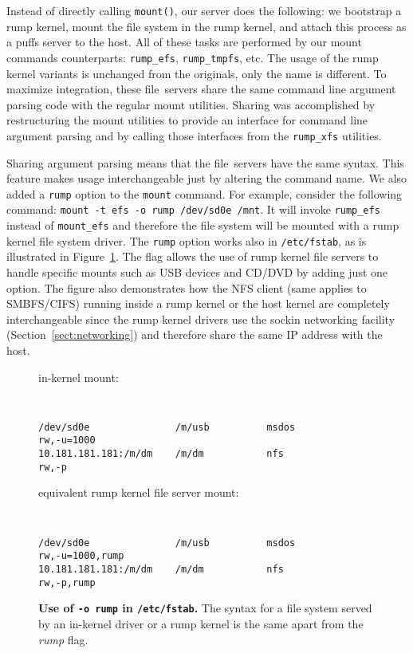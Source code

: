 Instead of directly calling \texttt{mount()}, our server does the
following: we bootstrap a rump
kernel, mount the file system in the rump kernel, and attach this
process as a puffs server to the host.  All of these tasks are
performed by our mount commands counterparts: \verb+rump_efs+,
\verb+rump_tmpfs+, etc.  The usage of the rump kernel variants is
unchanged from the originals, only the name is different.
To maximize integration, these file~servers share the same command
line argument parsing code with the regular mount utilities.  Sharing
was accomplished by restructuring the mount utilities to provide an interface
for command line argument parsing and by calling those interfaces from
the \verb+rump_xfs+ utilities.

Sharing argument parsing means that the file~servers have the
same syntax.  This feature makes usage interchangeable just by altering the
command name.  We also added a \texttt{rump} option to the
\texttt{mount} command.  For example,
consider the following command: \verb+mount -t efs -o rump /dev/sd0e /mnt+.
It will invoke \verb+rump_efs+ instead of \verb+mount_efs+
and therefore the file system will be mounted with a rump kernel
file system driver.
The \texttt{rump} option works also in
\texttt{/etc/fstab}, as is illustrated in Figure~\ref{fig:orump}.
The flag allows the use of rump kernel file servers to handle specific
mounts such as USB devices and CD/DVD by adding just one option.
The figure also demonstrates how the NFS client (same applies to SMBFS/CIFS)
running inside a rump kernel or the host kernel are completely
interchangeable since the rump kernel drivers use the sockin
networking facility (Section~\ref{sect:networking}) and therefore
share the same IP address with the host.

\begin{figure}[t]
\begin{flushleft}
in-kernel mount:
{\tt \small
\begin{verbatim}
/dev/sd0e               /m/usb          msdos           rw,-u=1000
10.181.181.181:/m/dm    /m/dm           nfs             rw,-p
\end{verbatim}}

equivalent rump kernel file server mount:
{\tt \small
\begin{verbatim}
/dev/sd0e               /m/usb          msdos           rw,-u=1000,rump
10.181.181.181:/m/dm    /m/dm           nfs             rw,-p,rump
\end{verbatim}}
\end{flushleft}
\caption[Use of \texttt{-o rump} in \texttt{/etc/fstab}]{
\textbf{Use of \texttt{-o rump} in \texttt{/etc/fstab}.}
The syntax for a file system served by an in-kernel driver or a rump
kernel is the same apart from the \textit{rump} flag.
}
\label{fig:orump}
\end{figure}

